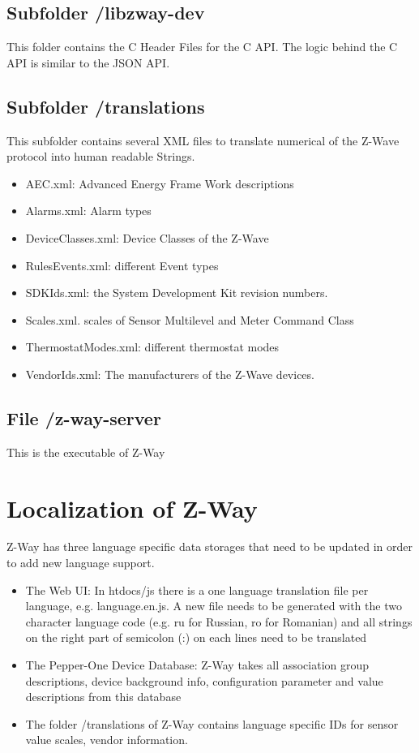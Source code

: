\subsection{Subfolder /libzway-dev}

This folder contains the C Header Files for the C API. The logic behind the C API is similar to the JSON API.

\subsection{Subfolder /translations}

This subfolder contains several XML files to translate numerical of the Z-Wave protocol into human readable Strings.
\begin{itemize}
\item AEC.xml: Advanced Energy Frame Work descriptions
\item Alarms.xml: Alarm types
\item DeviceClasses.xml: Device Classes of the Z-Wave
\item RulesEvents.xml: different Event types
\item SDKIds.xml: the System Development Kit revision numbers.
\item Scales.xml. scales of Sensor Multilevel and Meter Command Class
\item ThermostatModes.xml: different thermostat modes
\item VendorIds.xml: The manufacturers of the Z-Wave devices.

\end{itemize}
\subsection{File  /z-way-server}

This is the executable of Z-Way

\section{Localization of Z-Way}

Z-Way has three language specific data storages that need to be updated in order to add new language support.
\begin{itemize}
\item The Web UI: In htdocs/js there is a one language translation file per language, e.g. language.en.js. A new file needs to be generated with the two character language code (e.g. ru for Russian, ro for Romanian) and all strings on the right part of semicolon (:) on each lines need to be translated
\item The Pepper-One Device Database: Z-Way takes all association group descriptions, device background info, configuration parameter and value descriptions from this database
\item The folder /translations of Z-Way contains language specific IDs for sensor value scales, vendor information.

\end{itemize}